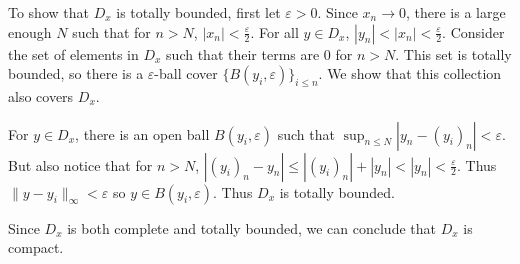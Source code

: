 \documentclass{article}
\theoremstyle{plain} %
\numberwithin{thm}{section} %
\theoremstyle{definition}
\begin{document}
\begin{question}{19}
        To show that \(D_x\) is totally bounded, first let \(\varepsilon > 0\). Since \(x_n \to 0\), there is a large enough \(N\) such that for \(n >N\), \(|x_n| < \frac{\varepsilon}{2}\). For all \(y \in D_x\), \(|y_n| < |x_n| < \frac{\varepsilon}{2}\). Consider the set of elements in \(D_x\) such that their terms are 0 for \(n > N\). This set is totally bounded, so there is a \(\varepsilon\)-ball cover \(\{B(y_i, \varepsilon)\}_{i \leq n}\). We show that this collection also covers \(D_x\).

        For \(y \in D_x\), there is an open ball \(B(y_i, \varepsilon)\) such that \(\sup_{n\leq N} {|y_n - (y_i)_n|} < \varepsilon\). But also notice that for \(n>N\), \(|(y_i)_n - y_n| \leq |(y_i)_n| + |y_n| < |y_n| < \frac{\varepsilon}{2}\). Thus \(\|y-y_i\| _{\infty} < \varepsilon\) so \(y \in B(y_i, \varepsilon)\). Thus \(D_x\) is totally bounded.

        Since \(D_x\) is both complete and totally bounded, we can conclude that \(D_x\) is compact.
    \end{question}
\end{document}
